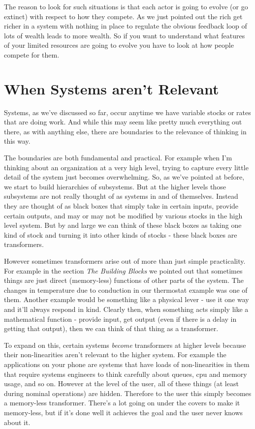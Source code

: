\documentclass[11pt,a5paper]{book}
\begin{document}
The reason to look for such situations is that each actor is going to evolve (or go extinct) with respect to how they compete. As we just pointed out the rich get richer in a system with nothing in place to regulate the obvious feedback loop of lots of wealth leads to more wealth. So if you want to understand what features of your limited resources are going to evolve you have to look at how people compete for them. 

\section{When Systems aren't Relevant}
Systems, as we've discussed so far, occur anytime we have variable stocks or rates that are doing work. And while this may seem like pretty much everything out there, as with anything else, there are boundaries to the relevance of thinking in this way. 
\newline

The boundaries are both fundamental and practical. For example when I'm thinking about an organization at a very high level, trying to capture every little detail of the system just becomes overwhelming. So, as we've pointed at before, we start to build hierarchies of subsystems. But at the higher levels those subsystems are not really thought of as systems in and of themselves. Instead they are thought of as black boxes that simply take in certain inputs, provide certain outputs, and may or may not be modified by various stocks in the high level system. But by and large we can think of these black boxes as taking one kind of stock and turning it into other kinds of stocks - these black boxes are transformers. 
\newline

However sometimes transformers arise out of more than just simple practicality. For example in the section \textit{The Building Blocks} we pointed out that sometimes things are just direct (memory-less) functions of other parts of the system. The changes in temperature due to conduction in our thermostat example was one of them. Another example would be something like a physical lever - use it one way and it'll always respond in kind. Clearly then, when something acts simply like a mathematical function - provide input, get output (even if there is a delay in getting that output), then we can think of that thing as a transformer. 
\newline

To expand on this, certain systems \textit{become} transformers at higher levels because their non-linearities aren't relevant to the higher system. For example the applications on your phone are systems that have loads of non-linearities in them that require systems engineers to think carefully about queues, cpu and memory usage, and so on. However at the level of the user, all of these things (at least during nominal operations) are hidden. Therefore to the user this simply becomes a memory-less transformer. There's a lot going on under the covers to make it memory-less, but if it's done well it achieves the goal and the user never knows about it. 
\newline
\end{document}
